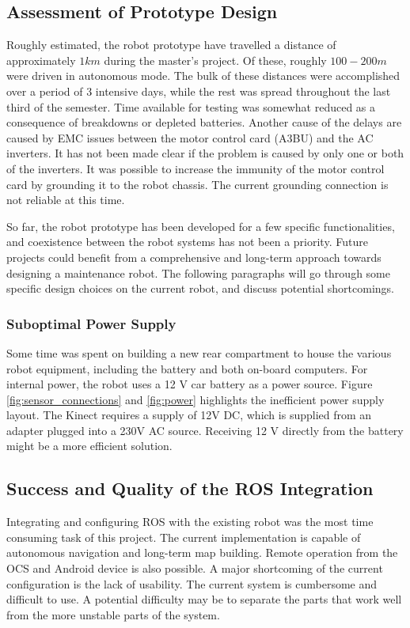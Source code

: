 \subsection{Assessment of Prototype Design}

Roughly estimated, the robot prototype have travelled a distance of approximately $1km$ during the master's project. Of these, roughly $100-200m$ were driven in autonomous mode. The bulk of these distances were accomplished over a period of 3 intensive days, while the rest was spread throughout the last third of the semester. Time available for testing was somewhat reduced as a consequence of breakdowns or depleted batteries. Another cause of the delays are caused by \ac{EMC} issues between the motor control card (A3BU) and the AC inverters. It has not been made clear if the problem is caused by only one or both of the inverters. It was possible to increase the immunity of the motor control card by grounding it to the robot chassis. The current grounding connection is not reliable at this time.

So far, the robot prototype has been developed for a few specific functionalities, and coexistence between the robot systems has not been a priority. Future projects could benefit from a comprehensive and long-term approach towards designing a maintenance robot. The following paragraphs will go through some specific design choices on the current robot, and discuss potential shortcomings. 

\subsubsection{Suboptimal Power Supply}

Some time was spent on building a new rear compartment to house the various robot equipment, including the battery and both on-board computers. For internal power, the robot uses a 12 V car battery as a power source. Figure \ref{fig:sensor_connections} and \ref{fig:power} highlights the inefficient power supply layout. The Kinect requires a supply of 12V DC, which is supplied from an adapter plugged into a 230V AC source. Receiving 12 V directly from the battery might be a more efficient solution.

\subsection{Success and Quality of the ROS Integration}

Integrating and configuring \ac{ROS} with the existing robot was the most time consuming task of this project. The current implementation is capable of autonomous navigation and long-term map building. Remote operation from the \ac{OCS} and Android device is also possible. A major shortcoming of the current configuration is the lack of usability. The current system is 
cumbersome and difficult to use. A potential difficulty may be to separate the parts that work well from the more unstable parts of the system. 


